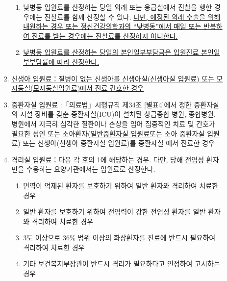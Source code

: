 \begin{enumerate}[1.]
\begin{enumerate}[가.]
\begin{enumerate}[(1)]
\begin{enumerate}[(가)]
			\item 낮병동 입원료를 산정하는 당일 외래 또는 응급실에서 진찰을 행한 경우에는 진찰료를 함께 산정할 수 있다. \uline{다만, 예정된 외래 수술을 위해 내원하는 경우 또는 정신건강의학과의 “낮병동”에서 매일 또는 반복하여 진료를 받는 경우에는 진찰료를 산정하지 아니한다.}
			\item \uline{낮병동 입원료를 산정하는 당일의 본인일부부담금은 입원진료 본인일부부담률에 따라 산정한다.}
			\end{enumerate}
		\item \uline{신생아 입원료：질병이 없는 신생아를 신생아실(신생아실 입원료) 또는 모자동실(모자동실입원료)에서 진료\cntrdot{} 간호한 경우}
		\item 중환자실 입원료 :「의료법」시행규칙 제34조 [별표4]에서 정한 중환자실의 시설\cntrdot{} 장비를 갖춘 중환자실(ICU)이 설치된 상급종합 병원, 종합병원, 병원에서 지극히 심각한 질환이나 손상을 입어 집중적인 치료 및 간호가 필요한 성인 또는 소아환자(\uline{일반중환자실 입원료}또는 소아 중환자실 입원료) 또는 신생아(신생아 중환자실 입원료)를 중환자실 에서 진료한 경우
		\item 격리실 입원료：다음 각 호의 1에 해당하는 경우. 다만, 당해 전염성 환자만을 수용하는 요양기관에서는 입원료로 산정한다.
			\begin{enumerate}[(가)]\tightlist
			\item 면역이 억제된 환자를 보호하기 위하여 일반 환자와 격리하여 치료한 경우			\item 일반 환자를 보호하기 위하여 전염력이 강한 전염성 환자를 일반 환자와 격리하여 치료한 경우
			\item 3도 이상으로 36\% 범위 이상의 화상환자를 진료에 반드시 필요하여 격리하여 치료한 경우
			\item 기타 보건복지부장관이 반드시 격리가 필요하다고 인정하여 고시하는 경우
			\end{enumerate}
		\end{enumerate}	
	\end{enumerate}
\end{enumerate}

